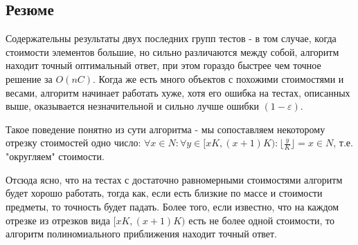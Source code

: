 \documentclass{article}
\begin{document}
	
	\subsection{Резюме}
	
	Содержательны результаты двух последних групп тестов - в том случае, когда стоимости элементов большие, но сильно различаются между собой, алгоритм находит точный оптимальный ответ, при этом гораздо быстрее чем точное решение за $O(nC)$. Когда же есть много объектов с похожими стоимостями и весами, алгоритм начинает работать хуже, хотя его ошибка на тестах, описанных выше, оказывается незначительной и сильно лучше ошибки $(1 - \varepsilon)$.
	
	Такое поведение понятно из сути алгоритма - мы сопоставляем некоторому отрезку стоимостей одно число:  $\forall x \in N: \forall y \in [x K, (x+1) K) :\lfloor\frac{y}{K}\rfloor = x \in N$, т.е. "округляем" стоимости. 
	
	Отсюда ясно, что на тестах с достаточно равномерными стоимостями алгоритм будет хорошо работать, тогда как, если есть близкие по массе и стоимости предметы, то точность будет падать. Более того, если известно, что на каждом отрезке из отрезков вида $[x K, (x + 1) K)$ есть не более одной стоимости, то алгоритм полиномиального приближения находит точный ответ.
	
\end{document}

